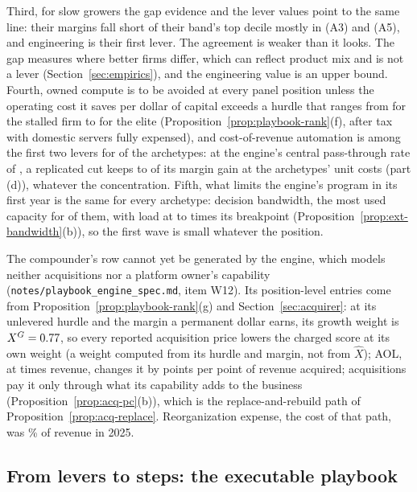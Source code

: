 Third, for slow growers the gap evidence and the lever values point to the same line: their margins fall short of their band's top decile mostly in \pbAThreeGap{} (A3) and \pbAFiveGap{} (A5), and engineering is their first lever. The agreement is weaker than it looks. The gap measures where better firms differ, which can reflect product mix and is not a lever (Section~\ref{sec:empirics}), and the engineering value is an upper bound. Fourth, owned compute is to be avoided at every panel position unless the operating cost it saves per dollar of capital exceeds a hurdle that ranges from \pbAFivePubCaph{} for the stalled firm to \pbASixPubCaph{} for the elite (Proposition~\ref{prop:playbook-rank}(f), after tax with domestic servers fully expensed), and cost-of-revenue automation is among the first two levers for \pbNCoRTopTwo{} of the archetypes: at the engine's central pass-through rate of \pbPtRate, a replicated cut keeps \pbKeepMin{} to \pbKeepMax{} of its margin gain at the archetypes' unit costs (part (d)), whatever the concentration. Fifth, what limits the engine's program in its first year is the same for every archetype: decision bandwidth, the most used capacity for \pbNBindBandwidth{} of them, with load at \pbBandwidthUseMin{} to \pbBandwidthUseMax{} times its breakpoint (Proposition~\ref{prop:ext-bandwidth}(b)), so the first wave is small whatever the position.

The compounder's row cannot yet be generated by the engine, which models neither acquisitions nor a platform owner's capability (\texttt{notes/playbook\_engine\_spec.md}, item W12). Its position-level entries come from Proposition~\ref{prop:playbook-rank}(g) and Section~\ref{sec:acquirer}: at its unlevered hurdle and the margin a permanent dollar earns, its growth weight is $X^G=0.77$, so every reported acquisition price lowers the charged score at its own weight (a weight computed from its hurdle and margin, not from $\hat X$); AOL, at \pbASevenAOLprice{} times revenue, changes it by \pbASevenAOL{} points per point of revenue acquired; acquisitions pay it only through what its capability adds to the business (Proposition~\ref{prop:acq-pc}(b)), which is the replace-and-rebuild path of Proposition~\ref{prop:acq-replace}. Reorganization expense, the cost of that path, was \pbASevenReorg\% of revenue in 2025.

\subsection{From levers to steps: the executable playbook}\label{sec:playbook-steps}

